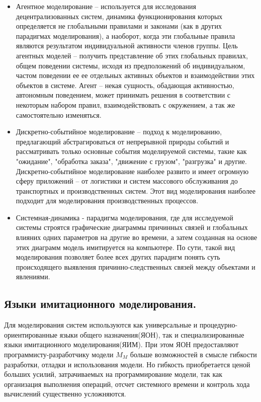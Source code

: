 \begin{itemize}
    \item Агентное моделирование -- используется для исследования децентрализованных систем, динамика функционирования которых определяется не глобальными правилами и законами (как в других парадигмах моделирования), а наоборот, когда эти глобальные правила являются результатом индивидуальной активности членов группы. Цель агентных моделей -- получить представление об этих глобальных правилах, общем поведении системы, исходя из предположений об индивидуальном, частом поведении ее ее отдельных активных объектов и взаимодействии этих объектов в системе. Агент -- некая сущность, обадающая активностью, автономным поведением, может принимать решения в соответствии с некоторым набором правил, взаимодействовать с окружением, а так же самостоятельно изменяться.
    \item Дискретно-событийное моделирование -- подход к моделированию, предлагающий абстрагироваться от непрерывной природы событий и рассматривать только основные события моделируемой системы, такие как "ожидание", "обработка заказа", "движение с грузом", "разгрузка" и другие. Дискретно-событийное моделирование наиболее развито и имеет огромную сферу приложений -- от логистики и систем массового обслуживания до транспортных и производственных систем. Этот вид моделирования наиболее подходит для моделирования производственных процессов.
    \item Системная-динамика - парадигма моделирования, где для исследуемой системы строятся графические диаграммы причинных связей и глобальных влияних одних параметров на другие во времени, а затем созданная на основе этих диаграмм модель имитируется на компьютере. По сути, такой вид моделирования позволяет более всех других парадигм понять суть происходящего выявления причинно-следственных связей между объектами и явлениями.
\end{itemize}

\subsection{Языки имитационного моделирования.}

    Для моделирования систем используются как универсальные и процедурно-ориентированные языки общего назначения(ЯОН), так и специализированные языки имитационного моделирования(ЯИМ). При этом ЯОН предоставляют программисту-разработчику модели $M_{M}$ больше возможностей в смысле гибкости разработки, отладки и использования модели. Но гибкость приобретается ценой больших усилий, затрачиваемых на программирование модели, так как организация выполнения операций, отсчет системного времени и контроль хода вычислений существенно усложняются.

